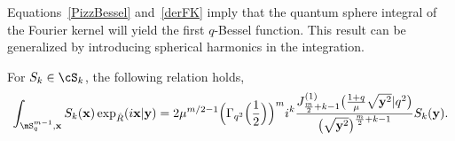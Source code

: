 Equations~\eqref{PizzBessel} and~\eqref{derFK} imply that the quantum sphere integral of the Fourier kernel will yield the f\/irst $q$-Bessel function. This result can be generalized by introducing spherical harmonics in the integration.

\begin{theorem}
\label{FHexp}
For $S_k\in\cS_k$, the following relation holds,
\begin{gather*}
\int_{\mS^{m-1}_q,\bold{x}}S_k(\bold{x})\exp_{\hat{R}}(i\bold{x}|\bold{y}) = 2\mu^{m/2-1} \Big(\Gamma_{q^2}\Big(\frac{1}{2}\Big)\Big)^{m}i^k\frac{J^{(1)}_{\frac{m}{2}+k-1}\big(\frac{1+q}{\mu}\sqrt{\bold{y}^2}|q^2\big)}
{\big(\sqrt{\bold{y}^2}\big)^{\frac{m}{2}+k-1}}S_k(\bold{y}).
\end{gather*}
\end{theorem}

